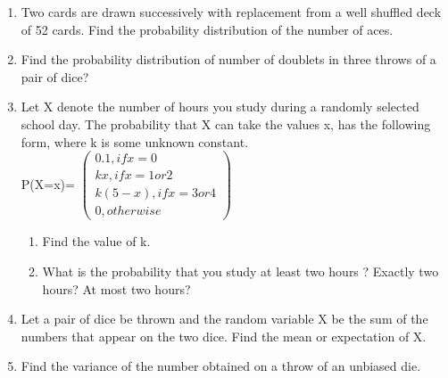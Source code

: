 \begin{enumerate}[label=\thesection.\arabic*.,ref=\thesection.\theenumi]
\item Two cards are drawn successively with replacement from a well shuffled deck of 52 cards. Find the probability distribution of the number of aces.\\

\item Find the probability distribution of number of doublets in three throws of a pair of dice?\\

\item Let X denote the number of hours you study during a randomly selected school day. The probability that X can take the values x, has the following form, where k is some unknown constant.\\
P(X=x)= $\begin{pmatrix} 0.1, if x= 0 \\ kx,if x= 1 or 2 \\ k(5-x), if x= 3 or 4 \\ 0, otherwise \end{pmatrix}$
\begin{enumerate}
\item  Find the value of k.
\item  What is the probability that you study at least two hours ? Exactly two hours? At
most two hours?
\end{enumerate}

\item Let a pair of dice be thrown and the random variable X be the sum of the numbers that appear on the two dice. Find the mean or expectation of X.\\

\item Find the variance of the number obtained on a throw of an unbiased die.\\


\end{enumerate}
